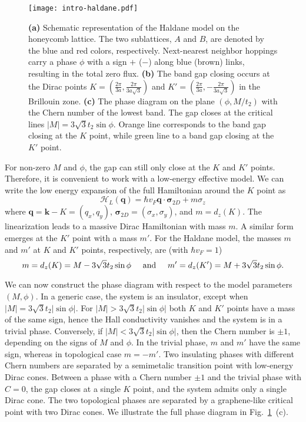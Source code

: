 \begin{figure}[H]
\centering
\texttt{[image: intro-haldane.pdf]}
\caption[The Haldane model]{\textbf{(a)} Schematic representation of the Haldane model on the honeycomb lattice. The two sublattices, $A$ and $B$, are denoted by the blue and red colors, respectively. Next-nearest neighbor hoppings carry a phase $\phi$ with a sign $+$ ($-$) along blue (brown) links, resulting in the total zero flux. \textbf{(b)} The band gap closing occurs at the Dirac points $K = \left( \frac{2 \pi}{3 a}, \frac{2 \pi}{3 a \sqrt{3}} \right)$ and $K' = \left( \frac{2 \pi}{3 a}, -\frac{2 \pi}{3 a \sqrt{3}} \right)$ in the Brillouin zone. \textbf{(c)} The phase diagram on the plane $(\phi, M /t_2)$ with the Chern number of the lowest band. The gap closes at the critical lines $|M| = 3 \sqrt{3} t_2 \sin \phi$. Orange line corresponds to the band gap closing at the $K$ point, while green line to a band gap closing at the $K'$ point.}
\label{fig:haldane}
\end{figure}

For non-zero $M$ and $\phi$, the gap can still only close at the $K$ and $K'$ points. Therefore, it is convenient to work with a low-energy effective model. We can write the low energy expansion of the full Hamiltonian around the $K$ point as
\begin{equation}
\mathcal{H}_L (\mathbf{q}) = \hbar v_F \mathbf{q} \cdot \boldsymbol{\sigma}_{2D} + m \sigma_z
\label{eq:linear-H}
\end{equation}
where $\mathbf{q} = \mathbf{k} - K = (q_x, q_y)$, $\boldsymbol{\sigma}_{2D}  = (\sigma_x, \sigma_y)$, and $ m = d_z( K)$. The linearization leads to a massive Dirac Hamiltonian with mass $m$. A similar form emerges at the $K'$ point with a mass $m'$. For the Haldane model, the masses $m$ and $m'$ at $K$ and $K'$ points, respectively, are (with $ \hbar v_F = 1$)
\begin{equation}
m = d_z ( K) = M - 3 \sqrt{3} t_2  \sin \phi \hspace*{0.5cm} \mathrm{and} \hspace*{0.5cm}  m' = d_z ( K') = M + 3 \sqrt{3} t_2  \sin \phi.
\end{equation}

We can now construct the phase diagram with respect to the model parameters $(M, \phi)$. In a generic case, the system is an insulator, except when $|M| = 3 \sqrt{3} t_2  |\sin \phi| $. For $|M| > 3 \sqrt{3} t_2 | \sin \phi|$ both $K$ and $K'$ points have a mass of the same sign, hence the Hall conductivity vanishes and the system is in a trivial phase. Conversely, if $|M| < 3 \sqrt{3} t_2  | \sin \phi| $, then the Chern number is $\pm 1$, depending on the signs of $M$ and $\phi$. In the trivial phase, $m$ and $m'$ have the same sign, whereas in topological case $m = -m'$. Two insulating phases with different Chern numbers are separated by a semimetalic transition point with low-energy Dirac cones. Between a phase with a Chern number $\pm 1$ and the trivial phase with $C = 0$, the gap closes at a single $K$ point, and the system admits only a single Dirac cone. The two topological phases are separated by a graphene-like critical point with two Dirac cones. We illustrate the full phase diagram in Fig.~\ref{fig:haldane}~(c).


